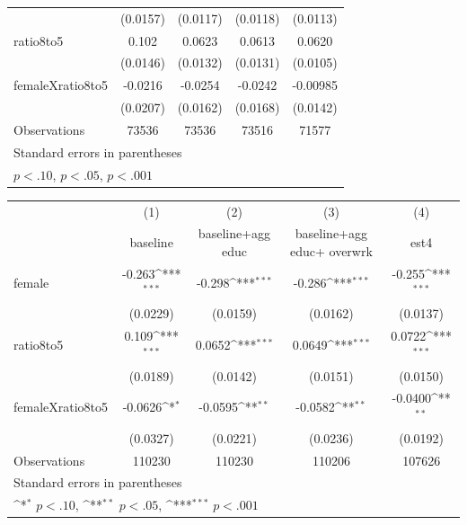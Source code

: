 \begin{table}[htbp]
{\begin{tabular}{l*{4}{c}}
                    &    (0.0157)         &    (0.0117)         &    (0.0118)         &    (0.0113)         \\
[1em]
ratio8to5           &       0.102\sym{***}&      0.0623\sym{***}&      0.0613\sym{***}&      0.0620\sym{***}\\
                    &    (0.0146)         &    (0.0132)         &    (0.0131)         &    (0.0105)         \\
[1em]
femaleXratio8to5    &     -0.0216         &     -0.0254         &     -0.0242         &    -0.00985         \\
                    &    (0.0207)         &    (0.0162)         &    (0.0168)         &    (0.0142)         \\
\hline
Observations        &       73536         &       73536         &       73516         &       71577         \\
\hline\hline
\multicolumn{5}{l}{\footnotesize Standard errors in parentheses}\\
\multicolumn{5}{l}{\footnotesize \sym{*} \(p<.10\), \sym{**} \(p<.05\), \sym{***} \(p<.001\)}\\
\end{tabular}
}
{
\def\sym#1{\ifmmode^{#1}\else\(^{#1}\)\fi}
\begin{tabular}{l*{4}{c}}
\hline\hline
                    &\multicolumn{1}{c}{(1)}&\multicolumn{1}{c}{(2)}&\multicolumn{1}{c}{(3)}&\multicolumn{1}{c}{(4)}\\
                    &\multicolumn{1}{c}{baseline }&\multicolumn{1}{c}{baseline+agg educ}&\multicolumn{1}{c}{baseline+agg educ+ overwrk}&\multicolumn{1}{c}{est4}\\
\hline
female              &      -0.263\sym{***}&      -0.298\sym{***}&      -0.286\sym{***}&      -0.255\sym{***}\\
                    &    (0.0229)         &    (0.0159)         &    (0.0162)         &    (0.0137)         \\
[1em]
ratio8to5           &       0.109\sym{***}&      0.0652\sym{***}&      0.0649\sym{***}&      0.0722\sym{***}\\
                    &    (0.0189)         &    (0.0142)         &    (0.0151)         &    (0.0150)         \\
[1em]
femaleXratio8to5    &     -0.0626\sym{*}  &     -0.0595\sym{**} &     -0.0582\sym{**} &     -0.0400\sym{**} \\
                    &    (0.0327)         &    (0.0221)         &    (0.0236)         &    (0.0192)         \\
\hline
Observations        &      110230         &      110230         &      110206         &      107626         \\
\hline\hline
\multicolumn{5}{l}{\footnotesize Standard errors in parentheses}\\
\multicolumn{5}{l}{\footnotesize \sym{*} \(p<.10\), \sym{**} \(p<.05\), \sym{***} \(p<.001\)}\\
\end{tabular}
}
\end{table}
